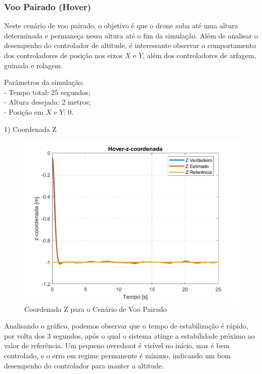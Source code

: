 \subsubsection{Voo Pairado (Hover)}

Neste cenário de voo pairado, o objetivo é que o drone suba até uma altura determinada e permaneça nessa altura até o fim da simulação. Além de analisar o desempenho do controlador de altitude, é interessante observar o comportamento dos controladores de posição nos eixos \(X\) e \(Y\), além dos controladores de arfagem, guinada e rolagem.

Parâmetros da simulação: \\

- Tempo total: 25 segundos;\\
- Altura desejada: 2 metros; \\
- Posição em \(X\) e \(Y\): 0.

1) Coordenada Z

\begin{figure}[H]
	\centering
	\includegraphics[width=1\textwidth]{Hover-z-coordenada.png}
	\caption{Coordenada Z para o Cenário de Voo Pairado}
	\label{fig:hover-z-coordenada}
\end{figure}

Analisando o gráfico, podemos observar que o tempo de estabilização é rápido, por volta dos 3 segundos, após o qual o sistema atinge a estabilidade próximo ao valor de referência. Um pequeno overshoot é visível no início, mas é bem controlado, e o erro em regime permanente é mínimo, indicando um bom desempenho do controlador para manter a altitude.

